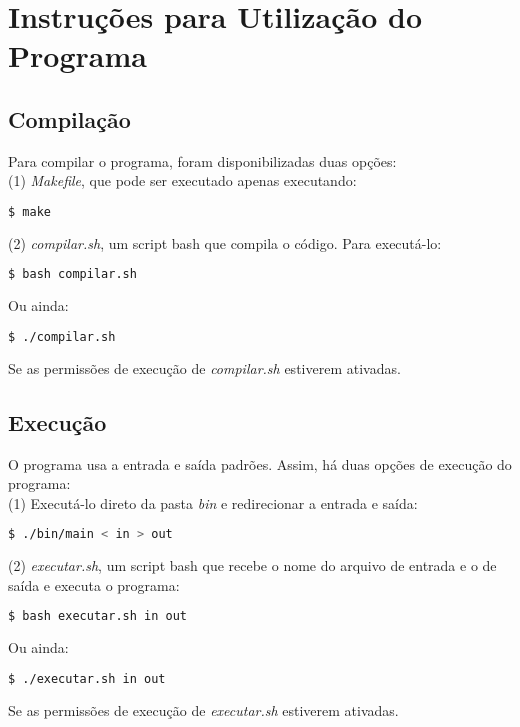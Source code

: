 \documentclass[10pt]{article}
\begin{document}
\section{Instruções para Utilização do Programa}
\subsection{Compilação}
Para compilar o programa, foram disponibilizadas duas opções:\\
(1) \textit{Makefile}, que pode ser executado apenas executando:
\begin{lstlisting}[language=bash]
  $ make
\end{lstlisting}

\noindent
(2) \textit{compilar.sh}, um script bash que compila o código. Para executá-lo:
\begin{lstlisting}[language=bash]
  $ bash compilar.sh
\end{lstlisting}

\noindent
Ou ainda:
\begin{lstlisting}[language=bash]
  $ ./compilar.sh
\end{lstlisting}
Se as permissões de execução de \textit{compilar.sh} estiverem ativadas.\cite{scriptPermissionsStack}


\subsection{Execução}
O programa usa a entrada e saída padrões. Assim, há duas opções de execução do programa:\\
(1) Executá-lo direto da pasta \textit{bin} e redirecionar a entrada e saída:
\begin{lstlisting}[language=bash]
  $ ./bin/main < in > out
\end{lstlisting}

\noindent
(2) \textit{executar.sh}, um script bash que recebe o nome do arquivo de entrada e o de saída e executa o programa:
\begin{lstlisting}[language=bash]
  $ bash executar.sh in out
\end{lstlisting}

\noindent
Ou ainda:
\begin{lstlisting}[language=bash]
  $ ./executar.sh in out
\end{lstlisting}
Se as permissões de execução de \textit{executar.sh} estiverem ativadas.\cite{scriptPermissionsStack}
\end{document}
